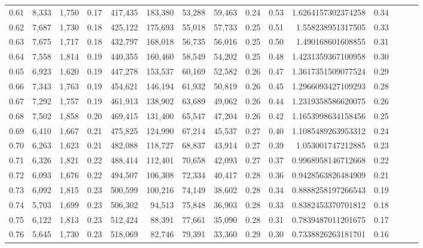 \begin{tabular}{rrrrrrrrrrrrrrr}
0.61 &   8,333 &  1,750 &  0.17 &  417,435 &  183,380 &   53,288 &   59,463 &  0.24 &  0.53 &    1.6264157302374258 &      0.34 \\
0.62 &   7,687 &  1,730 &  0.18 &  425,122 &  175,693 &   55,018 &   57,733 &  0.25 &  0.51 &     1.558238951317505 &      0.33 \\
0.63 &   7,675 &  1,717 &  0.18 &  432,797 &  168,018 &   56,735 &   56,016 &  0.25 &  0.50 &     1.490168601608855 &      0.31 \\
0.64 &   7,558 &  1,814 &  0.19 &  440,355 &  160,460 &   58,549 &   54,202 &  0.25 &  0.48 &    1.4231359367100958 &      0.30 \\
0.65 &   6,923 &  1,620 &  0.19 &  447,278 &  153,537 &   60,169 &   52,582 &  0.26 &  0.47 &    1.3617351509077524 &      0.29 \\
0.66 &   7,343 &  1,763 &  0.19 &  454,621 &  146,194 &   61,932 &   50,819 &  0.26 &  0.45 &    1.2966093427109293 &      0.28 \\
0.67 &   7,292 &  1,757 &  0.19 &  461,913 &  138,902 &   63,689 &   49,062 &  0.26 &  0.44 &    1.2319358586620075 &      0.26 \\
0.68 &   7,502 &  1,858 &  0.20 &  469,415 &  131,400 &   65,547 &   47,204 &  0.26 &  0.42 &    1.1653998634158456 &      0.25 \\
0.69 &   6,410 &  1,667 &  0.21 &  475,825 &  124,990 &   67,214 &   45,537 &  0.27 &  0.40 &    1.1085489263953312 &      0.24 \\
0.70 &   6,263 &  1,623 &  0.21 &  482,088 &  118,727 &   68,837 &   43,914 &  0.27 &  0.39 &     1.053001747212885 &      0.23 \\
0.71 &   6,326 &  1,821 &  0.22 &  488,414 &  112,401 &   70,658 &   42,093 &  0.27 &  0.37 &    0.9968958146712668 &      0.22 \\
0.72 &   6,093 &  1,676 &  0.22 &  494,507 &  106,308 &   72,334 &   40,417 &  0.28 &  0.36 &    0.9428563826484909 &      0.21 \\
0.73 &   6,092 &  1,815 &  0.23 &  500,599 &  100,216 &   74,149 &   38,602 &  0.28 &  0.34 &    0.8888258197266543 &      0.19 \\
0.74 &   5,703 &  1,699 &  0.23 &  506,302 &   94,513 &   75,848 &   36,903 &  0.28 &  0.33 &    0.8382453370701812 &      0.18 \\
0.75 &   6,122 &  1,813 &  0.23 &  512,424 &   88,391 &   77,661 &   35,090 &  0.28 &  0.31 &    0.7839487011201675 &      0.17 \\
0.76 &   5,645 &  1,730 &  0.23 &  518,069 &   82,746 &   79,391 &   33,360 &  0.29 &  0.30 &    0.7338826263181701 &      0.16 \\

\end{tabular}
